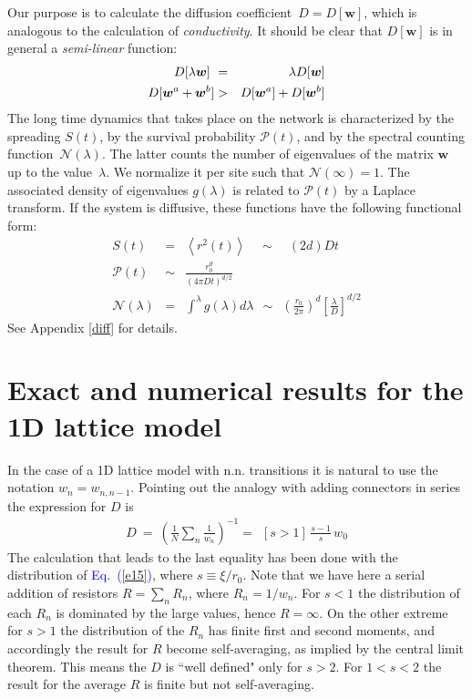 \documentclass[onecolumn,fleqn,12pt,openany,draft]{book}
\newcommand{\mylabel}[1]{\label{#1}}
\newcommand{\beq}{\begin{eqnarray}}
\newcommand{\eeq}{\end{eqnarray}}
\newcommand{\be}[1]{\begin{eqnarray}\ifthenelse{#1=-1}
{\nonumber}{\ifthenelse{#1=0}{}{\mylabel{e#1}}}}
\newcommand{\Eq}[1]{\textcolor{blue}{Eq.\!\!~(\ref{#1})}}
\begin{document}
Our purpose is to calculate 
the diffusion coefficient~$D=D[\bm{w}]$, which is analogous to the 
calculation of {\em conductivity}. It should be clear 
that $D[\bm{w}]$ is in general a {\em semi-linear} function:
%
\be{180}
D[\lambda \bm{w}] \ &=& \ \lambda D[\bm{w}] \\
D[\bm{w}^a+\bm{w}^b] &>& D[\bm{w}^a]+D[\bm{w}^b]
\eeq
%
The long time dynamics that takes place on the network 
is characterized by the spreading $S(t)$, 
by the survival probability $\mathcal{P}(t)$, 
and by the spectral counting function~$\mathcal{N}(\lambda)$.
The latter counts the number of eigenvalues of 
the matrix $\bm{w}$ up to the value~$\lambda$.
We normalize it per site such that ${\mathcal{N}(\infty)=1}$.
The associated density of eigenvalues $g(\lambda)$ 
is related to $\mathcal{P}(t)$ by a Laplace transform.
%
If the system is diffusive, these functions
have the following functional form: 
%
\beq
S(t) &=& \left\langle r^2(t)\right\rangle \quad\sim\quad  (2d)Dt\ \\
\mathcal{P}(t) &\sim&  \frac{r_0^d}{\left({4\pi D t}\right)^{d/2}} \\
\mathcal{N}(\lambda)  &=& \int^\lambda g(\lambda)d\lambda  
\ \ \sim \ \ \left(\frac{r_0}{2\pi}\right)^d\left[\frac{\lambda}{D}\right]^{d/2} 
\label{e6}
\eeq
%
See Appendix \ref{diff} for details.


\section{Exact and numerical results for the 1D lattice model}
\label{onedim}

In the case of a 1D lattice model with n.n. transitions 
it is natural to use the notation $w_n=w_{n,n{-}1}$. 
Pointing out the analogy with adding connectors in series 
the expression for $D$ is 
%
\beq
D \ = \ \left( \frac{1}{N} \sum_n \frac{1}{w_n} \right)^{-1} 
= \ \ [s>1] \, \frac{s-1}{s} \, w_0
\eeq
%
The calculation that leads to the last equality 
has been done with the distribution of \Eq{e15}, 
where ${s \equiv \xi/r_0}$.  Note that we have 
here a serial addition of resistors $R=\sum_n R_n$, 
where ${R_n=1/w_n}$.  For ${s<1}$ the distribution 
of each $R_n$ is dominated by the large values, 
hence ${R=\infty}$. On the other extreme for ${s>1}$ 
the distribution of the $R_n$ has finite first and second moments,  
and accordingly the result for $R$ become self-averaging, 
as implied by the central limit theorem.
This means the $D$ is ``well defined" only for ${s>2}$. 
For ${1<s<2}$ the result for the average $R$ is finite 
but not self-averaging.
\end{document}
